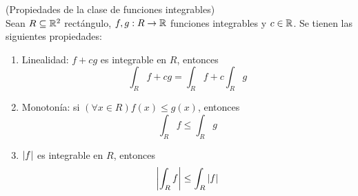 \begin{proposicion}{\rm (Propiedades de la clase de funciones integrables)}
\\Sean $ R \subseteq \mathbb{R}^2 $ rect\'angulo, $f, g : R \to \mathbb{R}$ funciones integrables y $ c \in \mathbb{R} $. Se tienen las siguientes propiedades:
\begin{enumerate}
    \item Linealidad: $f+cg$ es integrable en $ R $, entonces
        \[ \int_R f+cg = \int_R f + c \int_R g \]
    \item Monoton\'ia: si $(\forall x \in R) f(x) \leq g(x) $,
    entonces
        \[ \int_R f \leq \int_R g \]
    \item $ \left\lvert f\right\rvert $ es integrable  en $ R $, entonces
        \[ \left\lvert \int_R f \right\rvert \leq \int_R \left\lvert f\right\rvert \]
\end{enumerate}
\end{proposicion}

